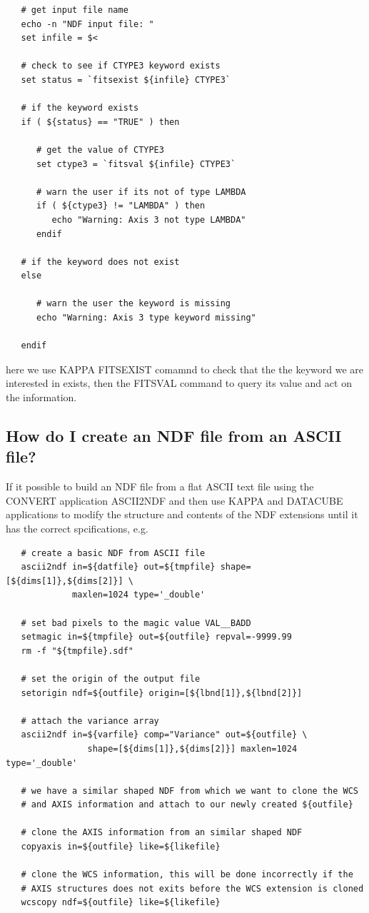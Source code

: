 \documentclass[twoside,11pt]{article}
\newcommand{\xref}[3]{#1}
\newcommand{\xlabel}[1]{}
\begin{document}
\small\begin{verbatim}
   # get input file name
   echo -n "NDF input file: "
   set infile = $<
   
   # check to see if CTYPE3 keyword exists
   set status = `fitsexist ${infile} CTYPE3`
   
   # if the keyword exists
   if ( ${status} == "TRUE" ) then
   
      # get the value of CTYPE3
      set ctype3 = `fitsval ${infile} CTYPE3`

      # warn the user if its not of type LAMBDA
      if ( ${ctype3} != "LAMBDA" ) then
         echo "Warning: Axis 3 not type LAMBDA"
      endif
      
   # if the keyword does not exist
   else
   
      # warn the user the keyword is missing
      echo "Warning: Axis 3 type keyword missing"
      
   endif
\end{verbatim}\normalsize

here we use KAPPA \xref{FITSEXIST}{sun95}{FITSEXIST} comamnd to check that the the keyword we are interested in exists, then the \xref{FITSVAL}{sun95}{FITSVAL} command to query its value and act on the information.

\subsection{\xlabel{sc16_newndf}How do I create an NDF file from an ASCII file?\label{sc16_newndf}}

If it possible to build an NDF file from a flat ASCII text file using the CONVERT application \xref{ASCII2NDF}{sun55}{ASCII2NDF} and then use \xref{KAPPA}{sun95}{} and \xref{DATACUBE}{sun237}{} applications to modify the structure and contents of the NDF extensions until it has the correct spcifications, e.g.\

\small\begin{verbatim}
   # create a basic NDF from ASCII file
   ascii2ndf in=${datfile} out=${tmpfile} shape=[${dims[1]},${dims[2]}] \
             maxlen=1024 type='_double' 

   # set bad pixels to the magic value VAL__BADD
   setmagic in=${tmpfile} out=${outfile} repval=-9999.99 
   rm -f "${tmpfile}.sdf"

   # set the origin of the output file
   setorigin ndf=${outfile} origin=[${lbnd[1]},${lbnd[2]}] 

   # attach the variance array
   ascii2ndf in=${varfile} comp="Variance" out=${outfile} \
                shape=[${dims[1]},${dims[2]}] maxlen=1024 type='_double' 

   # we have a similar shaped NDF from which we want to clone the WCS
   # and AXIS information and attach to our newly created ${outfile}
   
   # clone the AXIS information from an similar shaped NDF
   copyaxis in=${outfile} like=${likefile}
   
   # clone the WCS information, this will be done incorrectly if the
   # AXIS structures does not exits before the WCS extension is cloned
   wcscopy ndf=${outfile} like=${likefile}
\end{verbatim}\normalsize
\end{document}

